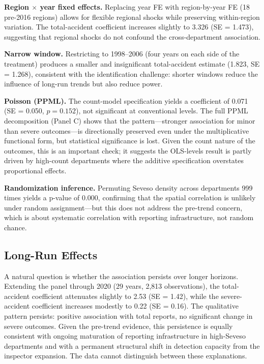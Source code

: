 \documentclass[12pt]{article}
\begin{document}
\textbf{Region $\times$ year fixed effects.} Replacing year FE with region-by-year FE (18 pre-2016 regions) allows for flexible regional shocks while preserving within-region variation. The total-accident coefficient increases slightly to 3.326 (SE = 1.473), suggesting that regional shocks do not confound the cross-department association.

\textbf{Narrow window.} Restricting to 1998--2006 (four years on each side of the treatment) produces a smaller and insignificant total-accident estimate (1.823, SE = 1.268), consistent with the identification challenge: shorter windows reduce the influence of long-run trends but also reduce power.

\textbf{Poisson (PPML).} The count-model specification yields a coefficient of 0.071 (SE = 0.050, $p = 0.152$), not significant at conventional levels. The full PPML decomposition (Panel C) shows that the pattern---stronger association for minor than severe outcomes---is directionally preserved even under the multiplicative functional form, but statistical significance is lost. Given the count nature of the outcomes, this is an important check; it suggests the OLS-levels result is partly driven by high-count departments where the additive specification overstates proportional effects.

\textbf{Randomization inference.} Permuting Seveso density across departments 999 times yields a p-value of 0.000, confirming that the spatial correlation is unlikely under random assignment---but this does not address the pre-trend concern, which is about systematic correlation with reporting infrastructure, not random chance.

\subsection{Long-Run Effects}

A natural question is whether the association persists over longer horizons. Extending the panel through 2020 (29 years, 2,813 observations), the total-accident coefficient attenuates slightly to 2.53 (SE = 1.42), while the severe-accident coefficient increases modestly to 0.22 (SE = 0.16). The qualitative pattern persists: positive association with total reports, no significant change in severe outcomes. Given the pre-trend evidence, this persistence is equally consistent with ongoing maturation of reporting infrastructure in high-Seveso departments and with a permanent structural shift in detection capacity from the inspector expansion. The data cannot distinguish between these explanations.
\end{document}
